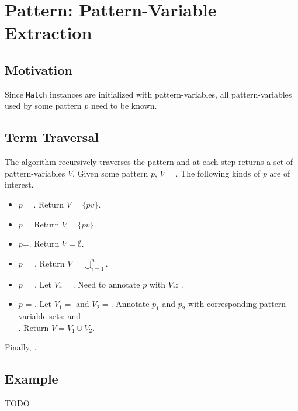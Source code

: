 \section{Pattern: Pattern-Variable Extraction}
\label{section:pv-extraction}

\subsection{Motivation}
Since \texttt{Match} instances are initialized with pattern-variables, all pattern-variables used by some pattern $p$ need to be known. 

\subsection{Term Traversal}
The algorithm recursively traverses the pattern and at each step returns a set of pattern-variables $V$. Given some pattern $p$, $V=$. The following kinds of $p$ are of interest.

\begin{itemize}
\item $p=$\NonTerminal. Return $V = \{ pv \}$.
\item $p$=\BuiltInPattern. Return $V=\{ pv \}$.
\item $p$=\LiteralPattern. Return $V=\emptyset$.
\item $p$ = \PatternSequence. Return $V=\bigcup_{i=1}^{n}$.
\item $p$ = \PatternRepeat. Let $V_r=$. Need to annotate $p$ with $V_r$: .
\item $p$ = \PatternInHole. Let $V_1=$ and  $V_2=$. Annotate $p_1$ and $p_2$ with corresponding pattern-variable sets:  and \\ . Return $V = V_1 \cup V_2$.
\end{itemize}

Finally, .

\subsection{Example}
TODO
